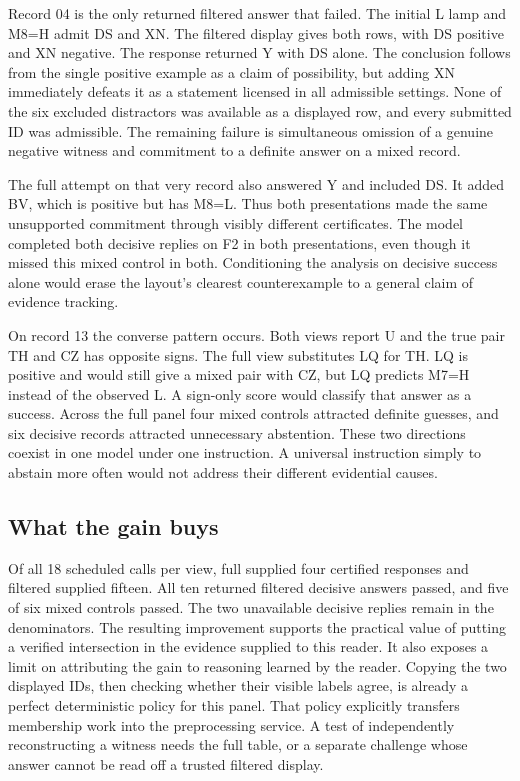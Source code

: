 \documentclass[12pt,letterpaper]{article}
\begin{document}
Record 04 is the only returned filtered answer that failed. The initial L lamp and M8=H admit DS and XN. The filtered display gives both rows, with DS positive and XN negative. The response returned Y with DS alone. The conclusion follows from the single positive example as a claim of possibility, but adding XN immediately defeats it as a statement licensed in all admissible settings. None of the six excluded distractors was available as a displayed row, and every submitted ID was admissible. The remaining failure is simultaneous omission of a genuine negative witness and commitment to a definite answer on a mixed record.

The full attempt on that very record also answered Y and included DS. It added BV, which is positive but has M8=L. Thus both presentations made the same unsupported commitment through visibly different certificates. The model completed both decisive replies on F2 in both presentations, even though it missed this mixed control in both. Conditioning the analysis on decisive success alone would erase the layout's clearest counterexample to a general claim of evidence tracking.

On record 13 the converse pattern occurs. Both views report U and the true pair TH and CZ has opposite signs. The full view substitutes LQ for TH. LQ is positive and would still give a mixed pair with CZ, but LQ predicts M7=H instead of the observed L. A sign-only score would classify that answer as a success. Across the full panel four mixed controls attracted definite guesses, and six decisive records attracted unnecessary abstention. These two directions coexist in one model under one instruction. A universal instruction simply to abstain more often would not address their different evidential causes.

\subsection{What the gain buys}

Of all 18 scheduled calls per view, full supplied four certified responses and filtered supplied fifteen. All ten returned filtered decisive answers passed, and five of six mixed controls passed. The two unavailable decisive replies remain in the denominators. The resulting improvement supports the practical value of putting a verified intersection in the evidence supplied to this reader. It also exposes a limit on attributing the gain to reasoning learned by the reader. Copying the two displayed IDs, then checking whether their visible labels agree, is already a perfect deterministic policy for this panel. That policy explicitly transfers membership work into the preprocessing service. A test of independently reconstructing a witness needs the full table, or a separate challenge whose answer cannot be read off a trusted filtered display.
\end{document}
